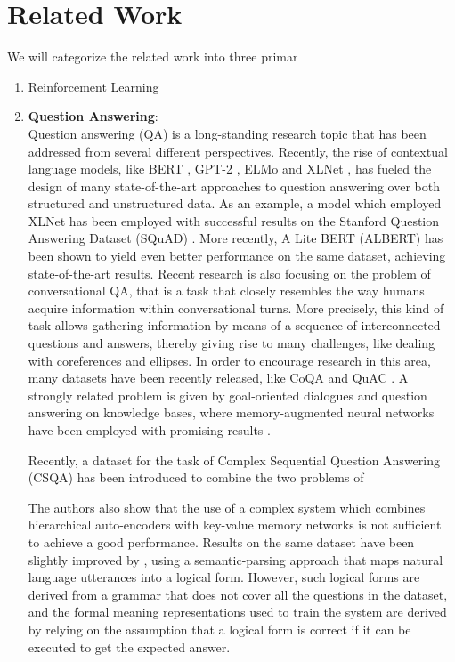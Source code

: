 \documentclass[letterpaper]{article} \usepackage{aaai20}  \usepackage{times}  \usepackage{helvet} \usepackage{courier}  \usepackage[hyphens]{url}  \usepackage{graphicx} \urlstyle{rm} \def\UrlFont{\rm}  \usepackage{graphicx}  \frenchspacing  \setlength{\pdfpagewidth}{8.5in}  \setlength{\pdfpageheight}{11in}
\begin{document}
\section{Related Work}
We will categorize the related work into three primar
\begin{enumerate}
\item Reinforcement Learning
\item \textbf{Question Answering}:\\ 
Question answering (QA) is a long-standing research topic that has been addressed from several different perspectives.
Recently, the rise of contextual language models, like BERT \cite{devlin2019bert}, GPT-2 \cite{radford2019language}, ELMo \cite{peters2018deep} and XLNet \cite{yang2019xlnet}, has fueled the design of many state-of-the-art approaches to question answering over both structured and unstructured data. As an example, a model which employed XLNet has been employed with successful results on the Stanford Question Answering Dataset (SQuAD) \cite{rajpurkar2016squad}.
More recently, A Lite BERT (ALBERT) \cite{lan2019albert} has been shown to yield even better performance on the same dataset, achieving state-of-the-art results.
Recent research is also focusing on the problem of conversational QA, that is a task that closely resembles the way humans acquire information within conversational turns. More precisely, this kind of task allows gathering information by means of a sequence of interconnected questions and answers, thereby giving rise to many challenges, like dealing with coreferences and ellipses. In order to encourage research in this area, many datasets have been recently released, like CoQA \cite{reddy2019coqa} and QuAC \cite{choi2018quac}.
A strongly related problem is given by goal-oriented dialogues and question answering on knowledge bases, where memory-augmented neural networks \cite{weston2014memory,graves2016hybrid} have been employed with promising results \cite{eric2017key,bordes2017learning}.

Recently, a dataset for the task of Complex Sequential Question Answering (CSQA) has been introduced to combine the two problems of
The authors also show that the use of a complex system which combines hierarchical auto-encoders with key-value memory networks is not sufficient to achieve a good performance.
Results on the same dataset have been slightly improved by \cite{guo2018dialog}, using a semantic-parsing approach that maps natural language utterances into a logical form. However, such logical forms are derived from a grammar that does not cover all the questions in the dataset, and the formal meaning representations used to train the system are derived by relying on the assumption that a logical form is correct if it can be executed to get the expected answer. 


\end{enumerate}
\end{document}
